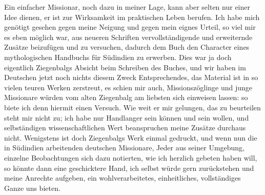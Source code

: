 \documentclass{article}
\begin{document}
Ein einfacher Missionar, noch dazu in meiner Lage, kann aber selten nur einer Idee dienen, er ist zur Wirksamkeit im praktischen Leben berufen. Ich habe mich genötigt gesehen gegen meine Neigung und gegen mein eignes Urteil, so viel mir es eben möglich war, aus neueren Schriften vervollständigende und erweiternde Zusätze beizufügen und zu versuchen, dadurch dem Buch den Character eines mythologischen Handbuchs für Südindien zu erwerben. Dies war ja doch eigentlich Ziegenbalgs Absicht beim Schreiben des Buches, und wir haben im Deutschen jetzt noch nichts diesem Zweck Entsprechendes, das Material ist in so vielen teuren Werken zerstreut, es schien mir auch, Missionszöglinge und junge Missionare würden vom alten Ziegenbalg am liebsten sich einweisen lassen: so biete ich denn hiermit einen Versuch. Wie weit er mir gelungen, das zu beurteilen steht mir nicht zu; ich habe nur Handlanger sein können und sein wollen, und selbständigen wissenschaftlichen Wert beanspruchen meine Zusätze durchaus nicht. Wenigstens ist doch Ziegenbalgs Werk einmal gedruckt, und wenn nun die in Südindien arbeitenden deutschen Missionare, Jeder aus seiner Umgebung, einzelne Beobachtungen sich dazu notierten, wie ich herzlich gebeten haben will, so könnte dann eine geschicktere Hand, ich selbst würde gern zurückstehen und meine Anrechte aufgeben, ein wohlverarbeitetes, einheitliches, vollständiges Ganze uns bieten.
\end{document}
